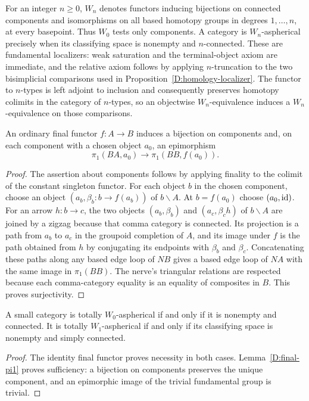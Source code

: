 \begin{definition}\label{D:n-convention}
For an integer $n\geq0$, $W_n$ denotes functors inducing bijections on connected components and isomorphisms on all based homotopy groups in degrees $1,\ldots,n$, at every basepoint. Thus $W_0$ tests only components. A category is $W_n$-aspherical precisely when its classifying space is nonempty and $n$-connected. These are fundamental localizers: weak saturation and the terminal-object axiom are immediate, and the relative axiom follows by applying $n$-truncation to the two bisimplicial comparisons used in Proposition~\ref{D:homology-localizer}. The functor to $n$-types is left adjoint to inclusion \citep[Proposition~5.5.6.18]{Lurie2009HTT} and consequently preserves homotopy colimits in the category of $n$-types, so an objectwise $W_n$-equivalence induces a $W_n$-equivalence on those comparisons.
\end{definition}

\begin{lemma}\label{D:final-pi1}
An ordinary final functor $f:A\to B$ induces a bijection on components and, on each component with a chosen object $a_0$, an epimorphism
\[
 \pi_1(BA,a_0)\longrightarrow\pi_1(BB,f(a_0)).
\]
\end{lemma}
\begin{proof}
The assertion about components follows by applying finality to the colimit of the constant singleton functor. For each object $b$ in the chosen component, choose an object $(a_b,\beta_b:b\to f(a_b))$ of $b\backslash A$. At $b=f(a_0)$ choose $(a_0,\mathrm{id})$. For an arrow $h:b\to c$, the two objects $(a_b,\beta_b)$ and $(a_c,\beta_ch)$ of $b\backslash A$ are joined by a zigzag because that comma category is connected. Its projection is a path from $a_b$ to $a_c$ in the groupoid completion of $A$, and its image under $f$ is the path obtained from $h$ by conjugating its endpoints with $\beta_b$ and $\beta_c$. Concatenating these paths along any based edge loop of $NB$ gives a based edge loop of $NA$ with the same image in $\pi_1(BB)$. The nerve's triangular relations are respected because each comma-category equality is an equality of composites in $B$. This proves surjectivity.
\end{proof}

\begin{theorem}\label{D:zero-one}
A small category is totally $W_0$-aspherical if and only if it is nonempty and connected. It is totally $W_1$-aspherical if and only if its classifying space is nonempty and simply connected.
\end{theorem}
\begin{proof}
The identity final functor proves necessity in both cases. Lemma~\ref{D:final-pi1} proves sufficiency: a bijection on components preserves the unique component, and an epimorphic image of the trivial fundamental group is trivial.
\end{proof}

